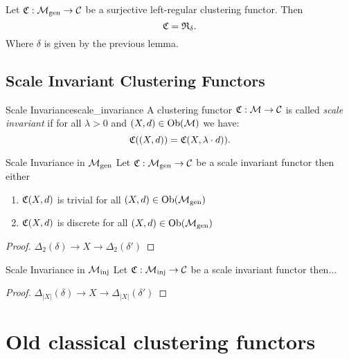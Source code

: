 \begin{theorem}{}{}
    Let $\mathfrak{C}: {\mathcal{M}_\mathrm{gen}} \to \mathcal{C}$ be a surjective left-regular clustering functor. Then
    $$
    \mathfrak{C} = \mathfrak{R}_{\delta}.
    $$
    Where $\delta$ is given by the previous lemma.

\end{theorem}

\section{Scale Invariant Clustering Functors}

\begin{definition}{Scale Invariance}{scale_invariance}
    A clustering functor $\mathfrak{C}: \mathcal{M} \to \mathcal{C}$ is called \emph{scale invariant} if for all $\lambda > 0$ and $(X,d) \in \mathrm {Ob}(\mathcal{M})$ we have:
    \begin{equation*}
        \mathfrak{C}((X,d)) = \mathfrak{C}(X,\lambda \cdot d)).
    \end{equation*}
\end{definition}

\begin{proposition}{Scale Invariance in ${\mathcal{M}_\mathrm{gen}}$}{}
    Let $\mathfrak{C}: {\mathcal{M}_\mathrm{gen}} \to \mathcal{C}$ be a scale invariant functor then either
    \begin{enumerate}
        \item $\mathfrak{C}(X,d)$ is trivial for all $(X,d) \in \mathrm {Ob}({\mathcal{M}_\mathrm{gen}})$
        \item $\mathfrak{C}(X,d)$ is discrete for all $(X,d) \in \mathrm {Ob}({\mathcal{M}_\mathrm{gen}})$
    \end{enumerate}
\end{proposition}

\begin{proof}
    $\Delta_2(\delta) \to X \to \Delta_2(\delta')$
\end{proof}

\begin{proposition}{Scale Invariance in ${\mathcal{M}_\mathrm{inj}}$}{}
    Let $\mathfrak{C}: {\mathcal{M}_\mathrm{inj}} \to \mathcal{C}$ be a scale invariant functor then...
\end{proposition}

\begin{proof}
    $\Delta_{|X|}(\delta) \to X \to \Delta_{|X|}(\delta')$
\end{proof}


\chapter*{Old classical clustering functors}


